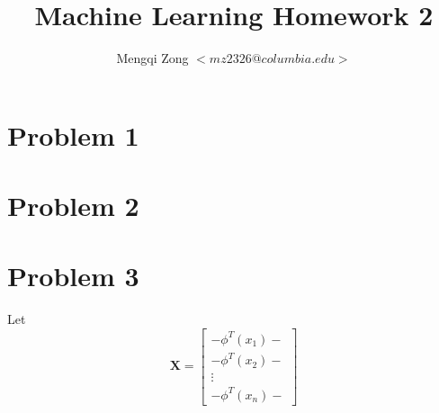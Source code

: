 \documentclass[12pt]{article}
\title{Machine Learning Homework 2}
\author{Mengqi Zong $<mz2326@columbia.edu>$}
\begin{document}
\maketitle

\setlength{\parindent}{0in}

\section{Problem 1}


\section{Problem 2}



\section{Problem 3}

Let
\begin{equation*}
  \textbf{X} =
  \begin{bmatrix}
    - \phi^T(x_1)- \\
    - \phi^T(x_2)- \\
    \vdots \\
    -\phi^T(x_n)- 
  \end{bmatrix}
\end{equation*}
\end{document}
